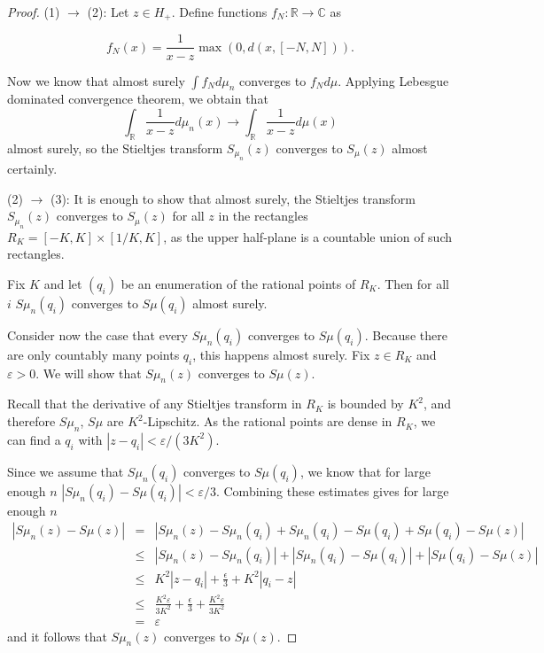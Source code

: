 \documentclass[12pt,a4paper,leqno]{report}
\newcommand{\R}{\mathbb{R}}
\newcommand{\C}{\mathbb{C}}
\newcommand{\eps}{\varepsilon}
\theoremstyle{plain}
\theoremstyle{definition}
\theoremstyle{remark}
\begin{document}
\begin{proof}
(1) $\rightarrow$ (2): Let $z \in H_+$. Define functions $f_N : \R \to \C$ as 

\begin{equation*}
f_N (x) = \frac{1}{x-z} \max(0,d(x,[-N,N])).
\end{equation*}

Now we know that almost surely $\int f_N d\mu_n$ converges to $f_N d\mu$. Applying Lebesgue dominated convergence theorem, we obtain that
\begin{equation*}
\int_{\R} \frac{1}{x-z} d\mu_n(x) \to 
\int_{\R} \frac{1}{x-z} d\mu(x)
\end{equation*}
almost surely, so the Stieltjes transform $S_{\mu_n}(z)$ converges to $S_{\mu}(z)$ almost certainly.

(2) $\rightarrow$ (3): It is enough to show that almost surely, the Stieltjes transform $S_{\mu_n}(z)$ converges to $S_{\mu}(z)$ for all $z$ in the rectangles $R_K = [-K,K] \times [1/K,K]$, as the upper half-plane is a countable union of such rectangles.

Fix $K$ and let $(q_i)$ be an enumeration of the rational points of $R_K$. Then for all $i$ $S\mu_n(q_i)$ converges to $S\mu(q_i)$ almost surely.

Consider now the case that every $S\mu_n(q_i)$ converges to $S\mu(q_i)$.
Because there are only countably many points $q_i$, this happens almost surely. Fix $z \in R_K$ and $\eps > 0$. We will show that $S\mu_n(z)$ converges to $S\mu(z)$.

Recall that the derivative of any Stieltjes transform in $R_K$ is bounded by $K^2$, and therefore $S\mu_n$, $S\mu$ are $K^2$-Lipschitz. As the rational points are dense in $R_K$, we can find a $q_i$ with 
$|z-q_i|< \eps /(3K^2)$.

Since we assume that $S\mu_n(q_i)$ converges to $S\mu(q_i)$, we know that for large enough $n$ $|S\mu_n(q_i)-S\mu(q_i)|< \eps / 3$. Combining these estimates gives for large enough $n$
\begin{eqnarray*}
|S\mu_n(z)-S\mu(z)| & = & |S\mu_n(z)-S\mu_n(q_i) + S\mu_n(q_i)-S\mu(q_i)+S\mu(q_i)-S\mu(z)|\\
& \leq & |S\mu_n(z)-S\mu_n(q_i)| + |S\mu_n(q_i)-S\mu(q_i)|+|S\mu(q_i)-S\mu(z)|\\
& \leq & K^2|z-q_i| + \frac{\epsilon}{3} + K^2|q_i-z|\\
& \leq & \frac{K^2\eps}{3K^2} + \frac{\epsilon}{3} + \frac{K^2\eps}{3K^2}\\
& = & \eps
\end{eqnarray*}
and it follows that $S\mu_n(z)$ converges to $S\mu(z)$.


\end{proof}
\end{document}
